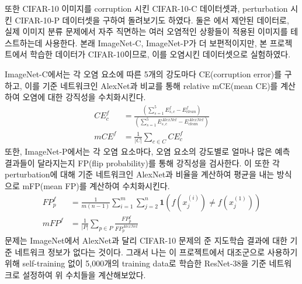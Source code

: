 \documentclass[a4paper, 10pt]{article}
\renewcommand{\vec}{\mathbf}
\begin{document}
또한 CIFAR-10 이미지를 corruption 시킨 CIFAR-10-C 데이터셋과, perturbation 시킨
CIFAR-10-P 데이터셋을 구하여 돌려보기도 하였다. 둘은
\cite{hendrycks2019benchmarking}에서 제안된 데이터로, 실제 이미지 분류 문제에서
자주 직면하는 여러 오염적인 상황들이 적용된 이미지를 테스트하는데 사용한다. 본래
ImageNet-C, ImageNet-P가 더 보편적이지만, 본 프로젝트에서 학습한 데이터가
CIFAR-10이므로, 이를 오염시킨 데이터셋으로 실험하였다. 

ImageNet-C에서는 각 오염 요소에 따른 5개의 강도마다 CE(corruption error)를
구하고, 이를 기준 네트워크인 AlexNet과 비교를 통해 relative mCE(mean CE)를
계산하여 오염에 대한 강직성을 수치화시킨다. \cite{hendrycks2019benchmarking}
\begin{align*}
  CE_{c}^f &= \frac{\left( \sum_{s=1}^5 E_{s,c}^f - E_{clean}^f \right)}
  {\left( \sum_{s=1}^5 E_{s,c}^{AlexNet} - E_{clean}^{AlexNet} \right)} \\
  mCE^f &= \frac{1}{|C|} \sum_{c \in C} CE_{c}^f
\end{align*}
또한, ImageNet-P에서는 각 오염 요소마다, 오염 요소의 강도별로 얼마나 많은 예측
결과들이 달라지는지 FP(flip probability)를 통해 강직성을 검사한다. 이 또한 각
perturbation에 대해 기준 네트워크인 AlexNet과 비율을 계산하여 평균을 내는
방식으로 mFP(mean FP)를 계산하여 수치화시킨다. \cite{hendrycks2019benchmarking}
\begin{align*}
  FP_{p}^f &= \frac{1}{m(n-1)} \sum_{i=1}^m \sum_{j=2}^n \vec{1}
  \left( f(x_j^{(i)}) \neq f(x_j^{(1)}) \right) \\
  mFP^f &= \frac{1}{|P|} \sum_{p \in P} \frac{FP_p^f}{FP_p^{AlexNet}}
\end{align*}
문제는 ImageNet에서 AlexNet과 달리 CIFAR-10 문제의 준 지도학습 결과에 대한 기준
네트워크 정보가 없다는 것이다. 그래서 나는 이 프로젝트에서 대조군으로 사용하기
위해 self-training 없이 5,000개의 training data로 학습한 ResNet-38을 기준
네트워크로 설정하여 위 수치들을 계산해보았다.
\end{document}

